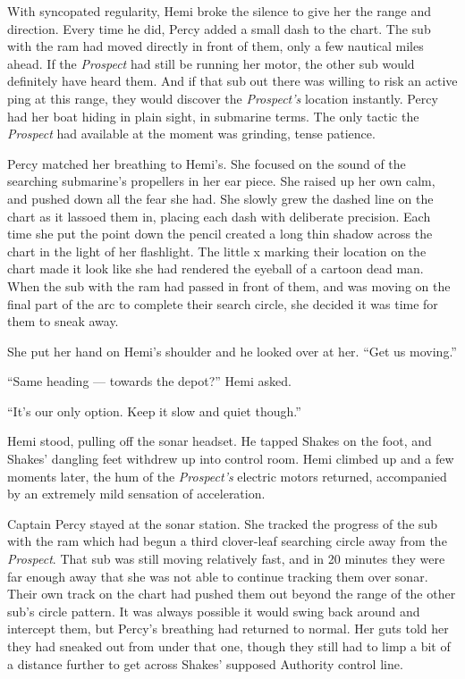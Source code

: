 \documentclass[
]{scrbook}
\begin{document}
With syncopated regularity, Hemi broke the silence to give her the range
and direction. Every time he did, Percy added a small dash to the chart.
The sub with the ram had moved directly in front of them, only a few
nautical miles ahead. If the \emph{Prospect} had still be running her
motor, the other sub would definitely have heard them. And if that sub
out there was willing to risk an active ping at this range, they would
discover the \emph{Prospect's} location instantly. Percy had her boat
hiding in plain sight, in submarine terms. The only tactic the
\emph{Prospect} had available at the moment was grinding, tense
patience.

Percy matched her breathing to Hemi's. She focused on the sound of the
searching submarine's propellers in her ear piece. She raised up her own
calm, and pushed down all the fear she had. She slowly grew the dashed
line on the chart as it lassoed them in, placing each dash with
deliberate precision. Each time she put the point down the pencil
created a long thin shadow across the chart in the light of her
flashlight. The little x marking their location on the chart made it
look like she had rendered the eyeball of a cartoon dead man. When the
sub with the ram had passed in front of them, and was moving on the
final part of the arc to complete their search circle, she decided it
was time for them to sneak away.

She put her hand on Hemi's shoulder and he looked over at her. ``Get us
moving.''

``Same heading --- towards the depot?'' Hemi asked.

``It's our only option. Keep it slow and quiet though.''

Hemi stood, pulling off the sonar headset. He tapped Shakes on the foot,
and Shakes' dangling feet withdrew up into control room. Hemi climbed up
and a few moments later, the hum of the \emph{Prospect's} electric
motors returned, accompanied by an extremely mild sensation of
acceleration.

Captain Percy stayed at the sonar station. She tracked the progress of
the sub with the ram which had begun a third clover-leaf searching
circle away from the \emph{Prospect}. That sub was still moving
relatively fast, and in 20 minutes they were far enough away that she
was not able to continue tracking them over sonar. Their own track on
the chart had pushed them out beyond the range of the other sub's circle
pattern. It was always possible it would swing back around and intercept
them, but Percy's breathing had returned to normal. Her guts told her
they had sneaked out from under that one, though they still had to limp
a bit of a distance further to get across Shakes' supposed Authority
control line.
\end{document}

